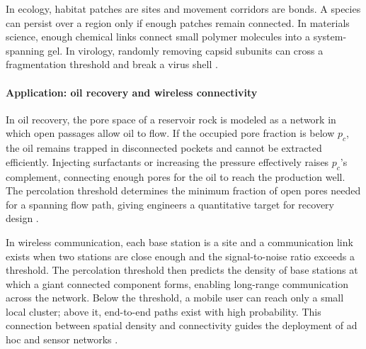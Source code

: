 In ecology, habitat patches are sites and movement corridors are bonds. A species can persist over a region only if enough patches remain connected. In materials science, enough chemical links connect small polymer molecules into a system-spanning gel. In virology, randomly removing capsid subunits can cross a fragmentation threshold and break a virus shell \cite{percolation_ref4}.

\paragraph{Application: oil recovery and wireless connectivity}
In oil recovery, the pore space of a reservoir rock is modeled as a network in which open passages allow oil to flow. If the occupied pore fraction is below $p_c$, the oil remains trapped in disconnected pockets and cannot be extracted efficiently. Injecting surfactants or increasing the pressure effectively raises $p_c$'s complement, connecting enough pores for the oil to reach the production well. The percolation threshold determines the minimum fraction of open pores needed for a spanning flow path, giving engineers a quantitative target for recovery design \cite{percolation_ref4}.

In wireless communication, each base station is a site and a communication link exists when two stations are close enough and the signal-to-noise ratio exceeds a threshold. The percolation threshold then predicts the density of base stations at which a giant connected component forms, enabling long-range communication across the network. Below the threshold, a mobile user can reach only a small local cluster; above it, end-to-end paths exist with high probability. This connection between spatial density and connectivity guides the deployment of ad hoc and sensor networks \cite{percolation_ref1,percolation_ref4}.

